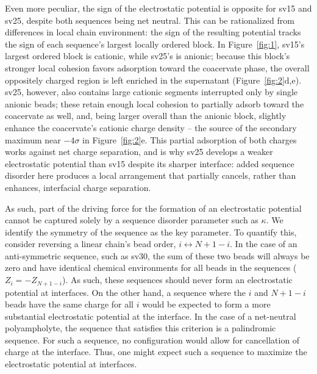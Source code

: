 \documentclass[journal=amlccd,manuscript=article,layout=twocolumn]{achemso}
\begin{document}
Even more peculiar, the sign of the electrostatic potential is opposite for sv15 and sv25, despite both sequences being net neutral. This can be rationalized from differences in local chain environment: the sign of the resulting potential tracks the sign of each sequence's largest locally ordered block. In Figure~\ref{fig:1}, sv15's largest ordered block is cationic, while sv25's is anionic; because this block's stronger local cohesion favors adsorption toward the coacervate phase, the overall oppositely charged region is left enriched in the supernatant (Figure~\ref{fig:2}d,e). sv25, however, also contains large cationic segments interrupted only by single anionic beads; these retain enough local cohesion to partially adsorb toward the coacervate as well, and, being larger overall than the anionic block, slightly enhance the coacervate's cationic charge density -- the source of the secondary maximum near $-4\sigma$ in Figure~\ref{fig:2}e. This partial adsorption of both charges works against net charge separation, and is why sv25 develops a weaker electrostatic potential than sv15 despite its sharper interface: added sequence disorder here produces a local arrangement that partially cancels, rather than enhances, interfacial charge separation.

As such, part of the driving force for the formation of an electrostatic potential cannot be captured solely by a sequence disorder parameter such as $\kappa$. We identify the symmetry of the sequence as the key parameter. To quantify this, consider reversing a linear chain's bead order, $i\leftrightarrow N+1-i$. In the case of an anti-symmetric sequence, such as sv30, the sum of these two beads will always be zero and have identical chemical environments for all beads in the sequences ($Z_i = -Z_{N+1-i}$). As such, these sequences should never form an electrostatic potential at interfaces. On the other hand, a sequence where the $i$ and $N+1-i$ beads have the same charge for all $i$ would be expected to form a more substantial electrostatic potential at the interface. In the case of a net-neutral polyampholyte, the sequence that satisfies this criterion is a palindromic sequence. For such a sequence, no configuration would allow for cancellation of charge at the interface. Thus, one might expect such a sequence to maximize the electrostatic potential at interfaces.
\end{document}
